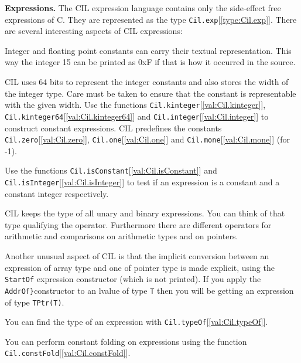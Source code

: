 \documentclass[11pt]{article}
\begin{document}
{\bf Expressions.} The CIL expression language contains only the side-effect free expressions of
C. They are represented as the type {\tt{Cil.exp}}[\ref{type:Cil.exp}]. There are several
interesting aspects of CIL expressions: 


 Integer and floating point constants can carry their textual representation.
This way the integer 15 can be printed as 0xF if that is how it occurred in the
source. 


 CIL uses 64 bits to represent the integer constants and also stores the width
of the integer type. Care must be taken to ensure that the constant is
representable with the given width. Use the functions {\tt{Cil.kinteger}}[\ref{val:Cil.kinteger}],
{\tt{Cil.kinteger64}}[\ref{val:Cil.kinteger64}] and {\tt{Cil.integer}}[\ref{val:Cil.integer}] to construct constant
expressions. CIL predefines the constants {\tt{Cil.zero}}[\ref{val:Cil.zero}],
{\tt{Cil.one}}[\ref{val:Cil.one}] and {\tt{Cil.mone}}[\ref{val:Cil.mone}] (for -1). 


 Use the functions {\tt{Cil.isConstant}}[\ref{val:Cil.isConstant}] and {\tt{Cil.isInteger}}[\ref{val:Cil.isInteger}] to test if
an expression is a constant and a constant integer respectively.


 CIL keeps the type of all unary and binary expressions. You can think of that
type qualifying the operator. Furthermore there are different operators for
arithmetic and comparisons on arithmetic types and on pointers. 


 Another unusual aspect of CIL is that the implicit conversion between an
expression of array type and one of pointer type is made explicit, using the
{\tt{StartOf}} expression constructor (which is not printed). If you apply the
{\tt{AddrOf\}}}constructor to an lvalue of type {\tt{T}} then you will be getting an
expression of type {\tt{TPtr(T)}}.


 You can find the type of an expression with {\tt{Cil.typeOf}}[\ref{val:Cil.typeOf}]. 


 You can perform constant folding on expressions using the function
{\tt{Cil.constFold}}[\ref{val:Cil.constFold}].
\end{document}
